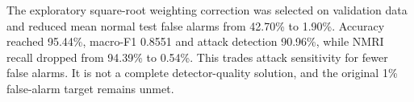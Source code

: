 The exploratory square-root weighting correction was selected on validation data and reduced mean normal test false alarms from 42.70\% to 1.90\%. Accuracy reached 95.44\%, macro-F1 0.8551 and attack detection 90.96\%, while NMRI recall dropped from 94.39\% to 0.54\%. This trades attack sensitivity for fewer false alarms. It is not a complete detector-quality solution, and the original 1\% false-alarm target remains unmet.
